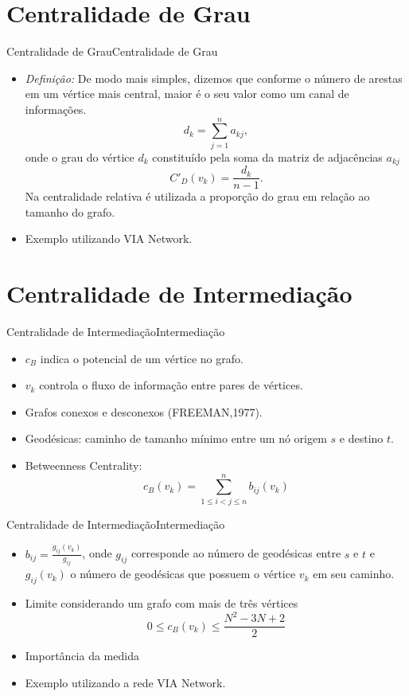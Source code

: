 \documentclass[10pt]{beamer}
\begin{document}
\section{Centralidade de Grau}
\begin{frame}{Centralidade de Grau}{Centralidade de Grau}
\begin{itemize}
\item \textit{Definição:} De modo mais simples, dizemos que conforme o número de arestas em um vértice mais central, maior é o seu valor como um canal de informações.
\begin{equation}
d_k= \sum_{j=1}^n a_{kj},
\end{equation}
onde o grau do vértice $d_k$ constituído pela soma da matriz de adjacências $a_{kj}$
\begin{equation}
C'_D(v_k) = \frac{d_k}{n-1}.
\end{equation}
Na centralidade relativa é utilizada a proporção do grau em relação ao tamanho do grafo.
\item Exemplo utilizando VIA Network.
\end{itemize}
\end{frame}

\section{Centralidade de Intermediação}
\begin{frame}{Centralidade de Intermediação}{Intermediação}
\begin{itemize}
\item $c_B$ indica o potencial de um vértice no grafo.
\item $v_k$ controla o fluxo de informação entre pares de vértices.
\item Grafos conexos e desconexos (FREEMAN,1977).
\item Geodésicas: caminho de tamanho mínimo entre um nó origem $s$ e destino $t$.
\item Betweenness Centrality: \begin{equation} 
		c_B(v_k)=\sum_{1\leqslant i < j \leqslant n}^{n} b_{ij}(v_k) 
		\end{equation}
\end{itemize}
\end{frame}

\begin{frame}{Centralidade de Intermediação}{Intermediação}
\begin{itemize}
\item $b_{ij}=\frac{g_{ij}(v_k)}{g_{ij}}$, onde $g_{ij}$ corresponde ao número de geodésicas entre $s$ e $t$ e $g_{ij}(v_k)$ o número de geodésicas que possuem o vértice $v_k$ em seu caminho.
\item Limite considerando um grafo com mais de três vértices
\begin{equation}
0 \leqslant c_B(v_k) \leqslant\frac{N^2-3N+2}{2}
\end{equation}
\item Importância da medida
\item Exemplo utilizando a rede VIA Network.
\end{itemize}
\end{frame}
\end{document}
